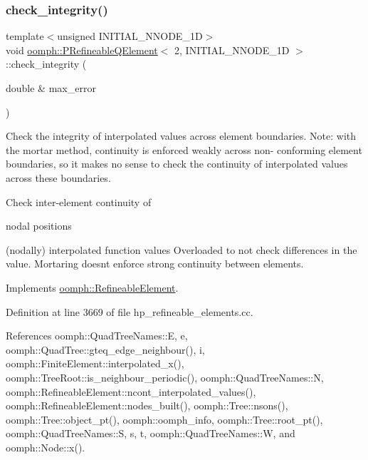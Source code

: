 \subsubsection{\texorpdfstring{check\+\_\+integrity()}{check\_integrity()}}
{\footnotesize\ttfamily template$<$unsigned I\+N\+I\+T\+I\+A\+L\+\_\+\+N\+N\+O\+D\+E\+\_\+1D$>$ \\
void \hyperlink{classoomph_1_1PRefineableQElement}{oomph\+::\+P\+Refineable\+Q\+Element}$<$ 2, I\+N\+I\+T\+I\+A\+L\+\_\+\+N\+N\+O\+D\+E\+\_\+1D $>$\+::check\+\_\+integrity (\begin{DoxyParamCaption}\item[{double \&}]{max\+\_\+error }\end{DoxyParamCaption})\hspace{0.3cm}{\ttfamily [virtual]}}



Check the integrity of interpolated values across element boundaries. Note\+: with the mortar method, continuity is enforced weakly across non-\/ conforming element boundaries, so it makes no sense to check the continuity of interpolated values across these boundaries. 

Check inter-\/element continuity of
\begin{DoxyItemize}
\item nodal positions
\item (nodally) interpolated function values Overloaded to not check differences in the value. Mortaring doesn\textquotesingle{}t enforce strong continuity between elements. 
\end{DoxyItemize}

Implements \hyperlink{classoomph_1_1RefineableElement_ae665f2d2eb0b6410ddcb101caa80922a}{oomph\+::\+Refineable\+Element}.



Definition at line 3669 of file hp\+\_\+refineable\+\_\+elements.\+cc.



References oomph\+::\+Quad\+Tree\+Names\+::E, e, oomph\+::\+Quad\+Tree\+::gteq\+\_\+edge\+\_\+neighbour(), i, oomph\+::\+Finite\+Element\+::interpolated\+\_\+x(), oomph\+::\+Tree\+Root\+::is\+\_\+neighbour\+\_\+periodic(), oomph\+::\+Quad\+Tree\+Names\+::N, oomph\+::\+Refineable\+Element\+::ncont\+\_\+interpolated\+\_\+values(), oomph\+::\+Refineable\+Element\+::nodes\+\_\+built(), oomph\+::\+Tree\+::nsons(), oomph\+::\+Tree\+::object\+\_\+pt(), oomph\+::oomph\+\_\+info, oomph\+::\+Tree\+::root\+\_\+pt(), oomph\+::\+Quad\+Tree\+Names\+::S, s, t, oomph\+::\+Quad\+Tree\+Names\+::W, and oomph\+::\+Node\+::x().

